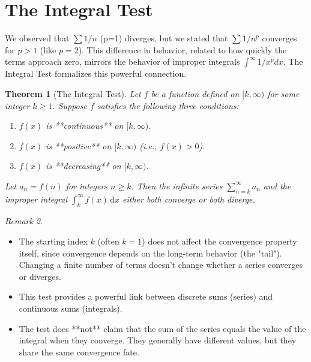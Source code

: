 \documentclass[11pt, letterpaper]{article}
\theoremstyle{plain} %
\newtheorem{theorem}{Theorem}[section] %
\theoremstyle{definition} %
\theoremstyle{remark} %
\newtheorem{remark}[theorem]{Remark} %
\newcommand{\dx}{\,\mathrm{d}x} %
\begin{document}
\section{The Integral Test}
\label{sec:integral-test}

We observed that $\sum 1/n$ (p=1) diverges, but we stated that $\sum 1/n^p$ converges for $p>1$ (like $p=2$). This difference in behavior, related to how quickly the terms approach zero, mirrors the behavior of improper integrals $\int^\infty 1/x^p dx$. The Integral Test formalizes this powerful connection.

\begin{theorem}[The Integral Test]
Let $f$ be a function defined on $[k, \infty)$ for some integer $k \ge 1$. Suppose $f$ satisfies the following three conditions:
\begin{enumerate}
    \item $f(x)$ is **continuous** on $[k, \infty)$.
    \item $f(x)$ is **positive** on $[k, \infty)$ (i.e., $f(x) > 0$).
    \item $f(x)$ is **decreasing** on $[k, \infty)$.
\end{enumerate}
Let $a_n = f(n)$ for integers $n \ge k$. Then the infinite series $\sum_{n=k}^{\infty} a_n$ and the improper integral $\int_k^{\infty} f(x) \dx$ either both converge or both diverge.
\end{theorem}

\begin{remark}
\begin{itemize}
    \item The starting index $k$ (often $k=1$) does not affect the convergence property itself, since convergence depends on the long-term behavior (the "tail"). Changing a finite number of terms doesn't change whether a series converges or diverges.
    \item This test provides a powerful link between discrete sums (series) and continuous sums (integrals).
    \item The test does **not** claim that the sum of the series equals the value of the integral when they converge. They generally have different values, but they share the same convergence fate.
\end{itemize}
\end{remark}
\end{document}
